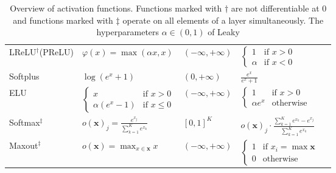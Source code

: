 \begin{table}[H]
\begin{tabular}{lllll}
    \parbox[t]{2.6cm}{\gls{LReLU}$^\dagger$\footnotemark\\(\gls{PReLU})} & $\varphi(x) = \max(\alpha x, x)$                        & $(-\infty, +\infty)$                                             & $\begin{cases}1 &\text{if } x > 0\\\alpha &\text{if } x < 0\end{cases}$ \\%
    Softplus                 & $\log(e^x + 1)$                                & $(0, +\infty)$                                       & $\frac{e^x}{e^x + 1}$    \\%
    \gls{ELU}                & $\begin{cases}x &\text{if } x > 0\\\alpha (e^x - 1) &\text{if } x \leq 0\end{cases}$ & $(-\infty, +\infty)$ & $\begin{cases}1 &\text{if } x > 0\\\alpha e^x &\text{otherwise}\end{cases}$ \\%
    Softmax$^\ddagger$       & $o(\mathbf{x})_j = \frac{e^{x_j}}{\sum_{k=1}^K e^{x_k}}$    & $[0, 1]^K$                                           & $o(\mathbf{x})_j \cdot \frac{\sum_{k=1}^K e^{x_k} - e^{x_j}}{\sum_{k=1}^K e^{x_k}}$          \\%
    Maxout$^\ddagger$        & $o(\mathbf{x}) = \max_{x \in \mathbf{x}} x$                 & $(-\infty, +\infty)$                                 & $\begin{cases}1 &\text{if } x_i = \max \mathbf{x}\\0 &\text{otherwise}\end{cases}$          \\%
    \bottomrule
    \end{tabular}
    \caption[Activation functions]{Overview of activation functions. Functions
             marked with $\dagger$ are not differentiable at 0 and functions
             marked with $\ddagger$ operate on all elements of a layer
             simultaneously. The hyperparameters $\alpha \in (0, 1)$ of Leaky
}
\end{table}
